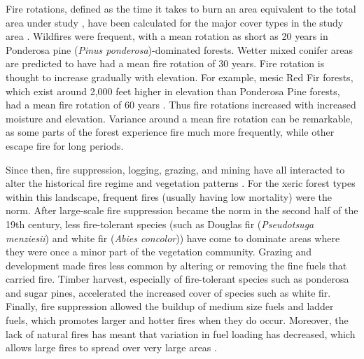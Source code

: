 Fire rotations, defined as the time it takes to burn an area equivalent to the total area under study \citep{Agee1993}, have been calculated for the major cover types in the study area \citep{Mallek2013}. Wildfires were frequent, with a mean rotation as short as 20 years in Ponderosa pine (\emph{Pinus ponderosa})-dominated forests. Wetter mixed conifer areas are predicted to have had a mean fire rotation of 30 years. Fire rotation is thought to increase gradually with elevation. For example, mesic Red Fir forests, which exist around 2,000 feet higher in elevation than Ponderosa Pine forests, had a mean fire rotation of 60 years \citep{Mallek2013}. Thus fire rotations increased with increased moisture and elevation. Variance around a mean fire rotation can be remarkable, as some parts of the forest experience fire much more frequently, while other escape fire for long periods. 

Since then, fire suppression, logging, grazing, and mining have all interacted to alter the historical fire regime and vegetation patterns \citep{Stephens2015,Knapp2013}. For the xeric forest types within this landscape, frequent fires (usually having low mortality) were the norm. After large-scale fire suppression became the norm in the second half of the 19th century, less fire-tolerant species (such as Douglas fir (\emph{Pseudotsuga menziesii}) and white fir (\emph{Abies concolor})) have come to dominate areas where they were once a minor part of the vegetation community. Grazing and development made fires less common by altering or removing the fine fuels that carried fire. Timber harvest, especially of fire-tolerant species such as ponderosa and sugar pines, accelerated the increased cover of species such as white fir. Finally, fire suppression allowed the buildup of medium size fuels and ladder fuels, which promotes larger and hotter fires when they do occur. Moreover, the lack of natural fires has meant that variation in fuel loading has decreased, which allows large fires to spread over very large areas \citep{Hessburg2005,Beaty2007,Meyer2008}.





